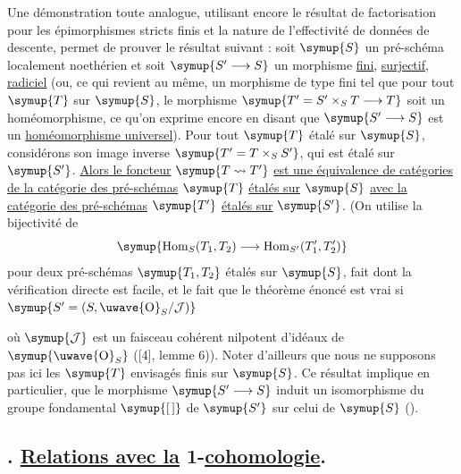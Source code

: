 Une démonstration toute analogue, utilisant encore le résultat de factorisation
pour les épimorphismes stricts finis et la nature  de l'effectivité
de données de descente, permet de prouver le résultat suivant : soit $\symup{S}$ un
pré-schéma localement noethérien et soit $\symup{S'\longrightarrow S}$ un morphisme
\uline{fini}, \uline{surjectif}, \uline{radiciel} (ou, ce qui revient au même, un morphisme de
type fini tel que pour tout $\symup{T}$ sur $\symup{S}$, le morphisme
$\symup{T'=S'\times_ST\longrightarrow T}$ soit un homéomorphisme, ce qu'on exprime
encore en disant que $\symup{S'\longrightarrow S}$ est un
\uline{homéomorphisme universel}). Pour tout $\symup{T}$ étalé sur $\symup{S}$, considérons son
image inverse $\symup{T'=T\times_SS'}$, qui est étalé sur $\symup{S'}$. \uline{Alors le foncteur} $\symup{T\rightsquigarrow T'}$ \uline{est une équivalence de catégories de la catégorie des pré-schémas} $\symup{T}$ \uline{étalés sur} $\symup{S}$ \uline{avec la catégorie des pré-schémas} $\symup{T'}$ \uline{étalés sur} $\symup{S'}$. (On utilise la bijectivité de
\[
  \symup{\operatorname{Hom}_S(T_1,T_2)\longrightarrow
  \operatorname{Hom}_{S'}(T'_1,T'_2)}
\]
pour deux pré-schémas $\symup{T_1,T_2}$ étalés sur $\symup{S}$, fait dont la vérification
directe est facile, et le fait que le théorème énoncé est vrai si
$\symup{S'=(S,\text{\uwave{O}}_S/\mathcal J)}$

où $\symup{\mathcal J}$ est un faisceau cohérent nilpotent d'idéaux de $\symup{\text{\uwave{O}}_S}$
([4], lemme 6)). Noter d'ailleurs que nous ne supposons pas ici les $\symup{T}$
envisagés finis sur $\symup{S}$. Ce résultat implique en particulier, que le morphisme
$\symup{S'\longrightarrow S}$ induit un isomorphisme du groupe fondamental $\symup{[\,]}$ de
$\symup{S'}$ sur celui de $\symup{S}$ ().

\subsection*{. \uline{Relations avec la} 1-\uline{cohomologie}.}

